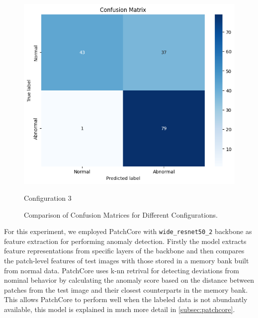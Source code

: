 \begin{figure}[ht!]
    \vspace{0.5cm} %
    
    \begin{minipage}{0.6\textwidth}
        \centering
        \includegraphics[width=\textwidth]{Rohit_Master_Thesis//Images/patchcore_config3_confusion_matrix.jpg} %
        \caption{Configuration 3}
    \end{minipage}
    
    \caption{Comparison of Confusion Matrices for Different Configurations.}
    \label{fig:dataset-NG}
\end{figure}
\fi

For this experiment, we employed PatchCore with \texttt{wide\_resnet50\_2} backbone as feature extraction for performing anomaly detection. Firstly the model extracts feature representations from specific layers of the backbone and then compares the patch-level features of test images with those stored in a memory bank built from normal data. PatchCore uses \gls{k-nn} retrival for detecting deviations from nominal behavior by calculating the anomaly score based on the distance between patches from the test image and their closest counterparts in the memory bank. This allows PatchCore to perform well when the labeled data is not abundantly available, this model is explained in much more detail in \ref{subsec:patchcore}.

